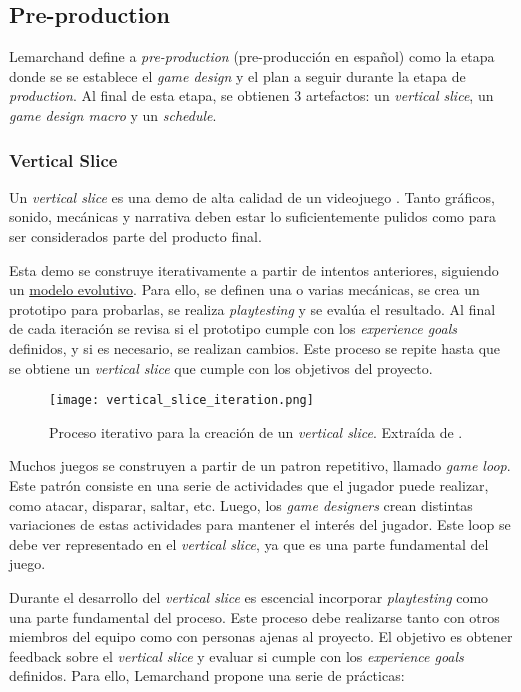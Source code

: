 \subsection{Pre-production}
\par Lemarchand define a \textit{pre-production} (pre-producción en español) como la etapa donde se se establece el \textit{game design} y el plan a seguir durante la etapa de \textit{production}. Al final de esta etapa, se obtienen 3 artefactos: un \textit{vertical slice}, un \textit{game design macro} y un \textit{schedule}. 
%
%
\subsubsection{Vertical Slice}
Un \textit{vertical slice} es una demo de alta calidad de un videojuego \cite{lemarchandPlayfulProductionProcess2021}. Tanto gráficos, sonido, mecánicas y narrativa deben estar lo suficientemente pulidos como para ser considerados parte del producto final. 
\par Esta demo se construye iterativamente a partir de intentos anteriores, siguiendo un \hyperref[sec:modelos_evolutivos]{modelo evolutivo}. Para ello, se definen una  o varias mecánicas, se crea un prototipo para probarlas, se realiza \textit{playtesting} y se evalúa el resultado. Al final de cada iteración se revisa si el prototipo cumple con los \textit{experience goals} definidos, y si es necesario, se realizan cambios. Este proceso se repite hasta que se obtiene un \textit{vertical slice} que cumple con los objetivos del proyecto.
\begin{figure}[h]
    \centering
    \texttt{[image: vertical\_slice\_iteration.png]}
    \caption{Proceso iterativo para la creación de un \textit{vertical slice}. Extraída de \cite{lemarchandPlayfulProductionProcess2021}.}
    \label{fig:x iteracion vertical slice}
\end{figure} 
\par Muchos juegos se construyen a partir de un patron repetitivo, llamado \textit{game loop}. Este patrón consiste en una serie de actividades que el jugador puede realizar, como atacar, disparar, saltar, etc. Luego, los \textit{game designers} crean distintas variaciones de estas actividades para mantener el interés del jugador. Este loop se debe ver representado en el \textit{vertical slice}, ya que es una parte fundamental del juego.
%
\par Durante el desarrollo del \textit{vertical slice} es escencial incorporar \textit{playtesting} como una parte fundamental del proceso. Este proceso debe realizarse tanto con otros miembros del equipo como con personas ajenas al proyecto. El objetivo es obtener feedback sobre el \textit{vertical slice} y evaluar si cumple con los \textit{experience goals} definidos. Para ello, Lemarchand propone una serie de prácticas:
